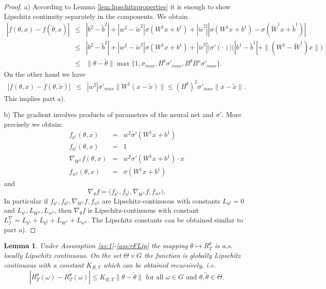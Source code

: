 \documentclass[reqno, 11pt]{amsart}%
\newtheorem{lemma}[theorem]{Lemma}
\theoremstyle{definition}
\begin{document}
\begin{proof}
a) According to Lemma \ref{lem:lipschitzproperties} it is enough to show Lipschitz continuity separately in the components. We obtain
\begin{eqnarray*}
|f(\theta,x)-f(\tilde\theta,x)| &\le& |b^2-\tilde b^2| + |w^2-\tilde w^2| \sigma(W^1x+b^1) + |\tilde w^2| |\sigma(W^1x+b^1)-\sigma(\tilde W^1x+\tilde b^1)|\\
&\le &  |b^2-\tilde b^2| + |w^2-\tilde w^2| \sigma(W^1x+b^1) + |\tilde w^2| |\sigma'(\cdot)| \Big(|b^1-\tilde b^1| +\|(W^1-\tilde W^1)x\| \Big) \\
&\le & \|\theta-\tilde\theta\| \max\{1,\sigma_{max}, B^\theta \sigma'_{max}, B^\theta B^x \sigma'_{max}\}.
\end{eqnarray*}
On the other hand we have
\begin{eqnarray*}
|f(\theta,x)-f(\theta,\tilde x)| &\le&  |w^2|  \sigma'_{max}  \|W^1(x-\tilde x)\| \le (B^\theta)^2 \sigma'_{max} \|x-\tilde x\|.
\end{eqnarray*}
This implies part a).

b) The gradient involves products of parameters of the neural net and $\sigma'$. More precisely we obtain:
\begin{eqnarray*}
    f_{b^1}(\theta,x) &=& w^2 \sigma'(W^1x+b^1) \\
    f_{b^2}(\theta,x) &=& 1 \\
    \nabla_{W^1} f(\theta,x) &=& w^2 \sigma'(W^1x+b^1) \cdot x \\
    f_{w^2}(\theta,x) &=&  \sigma(W^1x+b^1)
\end{eqnarray*}
and 
$$\nabla_\theta f=\Big(f_{b^1}, f_{b^2}, \nabla_{W^1} f, f_{w^2}  \Big). $$
In particular if $f_{b^1}, f_{b^2}, \nabla_{W^1} f, f_{w^2}$  are Lipschitz-continuous with constants $L_{b^2}=0$ and  $L_{b^1},L_{W^1},L_{w^2}$, then $\nabla_\theta f$ is  Lipschitz-continuous with constant  $L_f^\nabla =  L_{b^1}+ L_{b^2}+L_{W^1}+L_{w^2}.$ The Lipschitz constants can be obtained similar to part a).
\end{proof}

\begin{lemma}\label{lem:LR}
Under Assumption \ref{as:1}-\ref{ass:rFLip}
the mapping $\theta \mapsto R_T^\theta$ is a.s. locally Lipschitz continuous. On the set $\Theta\times G$ the function is globally Lipschitz continuous with a constant $K_{R,T}$ which can be obtained recursively, i.e.
$$| R_T^\theta(\omega) - R_T^{\tilde \theta}(\omega)| \le K_{R,T} \|\theta-\tilde\theta\| \mbox{ for all } \omega \in G \mbox{ and } \theta,\tilde\theta\in\Theta.$$
\end{lemma}
\end{document}
